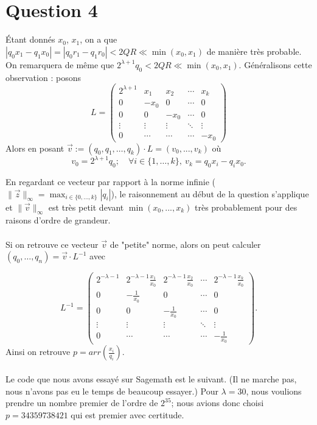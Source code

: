 \documentclass{article}
\begin{document}
\section{Question 4}

Étant donnés \(x_0\), \(x_1\), on a que \(|q_0 x_1 - q_1 x_0| = |q_0r_1 - q_1r_0| < 2QR \ll \min(x_0,x_1) \) de manière très probable. On remarquera de même que $2^{\lambda+1}q_0 < 2QR \ll \min(x_0,x_1)$. Généralisons cette observation : posons
\[
L =
\begin{pmatrix}
2^{\lambda + 1} & x_1 & x_2 & \cdots & x_k \\
0 & -x_0 & 0 & \cdots & 0 \\
0 & 0 & -x_0 & \cdots & 0 \\
\vdots & \vdots & \vdots & \ddots & \vdots \\
0 & \cdots & \cdots & \cdots & -x_0
\end{pmatrix}
\]
Alors en posant $\vec{v} := (q_0, q_1, \ldots, q_k)\cdot L = (v_0,...,v_k)$ où
\[v_0 = 2^{\lambda+1}q_0; \quad \forall i\in \{1,\dots,k\}, \ v_k = q_0x_i - q_ix_0.\]

En regardant ce vecteur par rapport à la norme infinie ($\displaystyle \|\vec{z}\|_\infty = \max_{i\in \{0,\dots,k\}}|q_i|$), le raisonnement au début de la question s'applique et $\|\vec{v}\|_\infty$ est très petit devant $\min(x_0,...,x_k)$ très probablement pour des raisons d'ordre de grandeur. \\ \\
Si on retrouve ce vecteur $\vec{v}$ de "petite" norme, alors on peut calculer $(q_0,\dots,q_n) = \vec{v}\cdot L^{-1}$ avec

\[
L^{-1} =
\begin{pmatrix}
2^{-\lambda - 1} & 2^{-\lambda - 1}\frac{x_1}{x_0} & 2^{-\lambda - 1}\frac{x_2}{x_0} & \cdots & 2^{-\lambda - 1}\frac{x_k}{x_0} \\
0 & -\frac{1}{x_0} & 0 & \cdots & 0 \\
0 & 0 & -\frac{1}{x_0} & \cdots & 0 \\
\vdots & \vdots & \vdots & \ddots & \vdots \\
0 & \cdots & \cdots & \cdots & -\frac{1}{x_0}
\end{pmatrix}.
\]
Ainsi on retrouve $\displaystyle p = arr\left(\frac{x_i}{q_i}\right)$.\\ \\
Le code que nous avons essayé sur Sagemath est le suivant. (Il ne marche pas, nous n'avons pas eu le temps de beaucoup essayer.) Pour $\lambda = 30$, nous voulions prendre un nombre premier de l'ordre de $2^{35}$; nous avions donc choisi $p = 34359738421$ qui est premier avec certitude.
\end{document}
